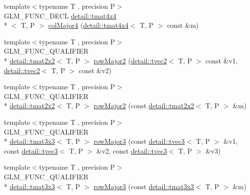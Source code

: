 \begin{DoxyCompactItemize}
\item 
{\footnotesize template$<$typename T , precision P$>$ }\\G\-L\-M\-\_\-\-F\-U\-N\-C\-\_\-\-D\-E\-C\-L \hyperlink{structglm_1_1detail_1_1tmat4x4}{detail\-::tmat4x4}\\*
$<$ T, P $>$ \hyperlink{group__gtx__matrix__major__storage_ga89086c0396205669304be98a8c601b78}{col\-Major4} (\hyperlink{structglm_1_1detail_1_1tmat4x4}{detail\-::tmat4x4}$<$ T, P $>$ const \&m)
\item 
{\footnotesize template$<$typename T , precision P$>$ }\\G\-L\-M\-\_\-\-F\-U\-N\-C\-\_\-\-Q\-U\-A\-L\-I\-F\-I\-E\-R \\*
\hyperlink{structglm_1_1detail_1_1tmat2x2}{detail\-::tmat2x2}$<$ T, P $>$ \hyperlink{group__gtx__matrix__major__storage_ga63d72819ad07f4f875a0565f1462652b}{row\-Major2} (\hyperlink{structglm_1_1detail_1_1tvec2}{detail\-::tvec2}$<$ T, P $>$ const \&v1, \hyperlink{structglm_1_1detail_1_1tvec2}{detail\-::tvec2}$<$ T, P $>$ const \&v2)
\item 
{\footnotesize template$<$typename T , precision P$>$ }\\G\-L\-M\-\_\-\-F\-U\-N\-C\-\_\-\-Q\-U\-A\-L\-I\-F\-I\-E\-R \\*
\hyperlink{structglm_1_1detail_1_1tmat2x2}{detail\-::tmat2x2}$<$ T, P $>$ \hyperlink{group__gtx__matrix__major__storage_ga5e3cee7cdc09b9ebf0e072247a5eac54}{row\-Major2} (const \hyperlink{structglm_1_1detail_1_1tmat2x2}{detail\-::tmat2x2}$<$ T, P $>$ \&m)
\item 
{\footnotesize template$<$typename T , precision P$>$ }\\G\-L\-M\-\_\-\-F\-U\-N\-C\-\_\-\-Q\-U\-A\-L\-I\-F\-I\-E\-R \\*
\hyperlink{structglm_1_1detail_1_1tmat3x3}{detail\-::tmat3x3}$<$ T, P $>$ \hyperlink{group__gtx__matrix__major__storage_gaacbbf46215dff1c3da9599916ba04a94}{row\-Major3} (const \hyperlink{structglm_1_1detail_1_1tvec3}{detail\-::tvec3}$<$ T, P $>$ \&v1, const \hyperlink{structglm_1_1detail_1_1tvec3}{detail\-::tvec3}$<$ T, P $>$ \&v2, const \hyperlink{structglm_1_1detail_1_1tvec3}{detail\-::tvec3}$<$ T, P $>$ \&v3)
\item 
{\footnotesize template$<$typename T , precision P$>$ }\\G\-L\-M\-\_\-\-F\-U\-N\-C\-\_\-\-Q\-U\-A\-L\-I\-F\-I\-E\-R \\*
\hyperlink{structglm_1_1detail_1_1tmat3x3}{detail\-::tmat3x3}$<$ T, P $>$ \hyperlink{group__gtx__matrix__major__storage_gafb5e7381b2451a85db394c457c284fb7}{row\-Major3} (const \hyperlink{structglm_1_1detail_1_1tmat3x3}{detail\-::tmat3x3}$<$ T, P $>$ \&m)

\end{DoxyCompactItemize}
